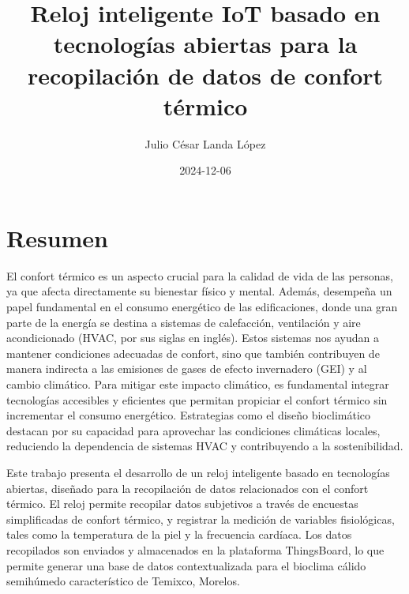 \documentclass[
  12pt,
  letterpaper,
  DIV=11,
  numbers=noendperiod]{scrreport}
\title{Reloj inteligente IoT basado en tecnologías abiertas para la
recopilación de datos de confort térmico}
\author{Julio César Landa López}
\date{2024-12-06}
\renewcommand*\contentsname{Tabla de contenidos}
\newcommand\contentsname{Tabla de contenidos}
\begin{document}
\maketitle
\ifdefined\Shaded\renewenvironment{Shaded}{\begin{tcolorbox}[boxrule=0pt, breakable, borderline west={3pt}{0pt}{shadecolor}, frame hidden, sharp corners, interior hidden, enhanced]}{\end{tcolorbox}}\fi

\renewcommand*\contentsname{Tabla de contenidos}
{
\hypersetup{linkcolor=}
\setcounter{tocdepth}{2}
\tableofcontents
}
\listoffigures
\listoftables
{}

\hypertarget{resumen}{%
\chapter*{Resumen}\label{resumen}}


El confort térmico es un aspecto crucial para la calidad de vida de las
personas, ya que afecta directamente su bienestar físico y mental.
Además, desempeña un papel fundamental en el consumo energético de las
edificaciones, donde una gran parte de la energía se destina a sistemas
de calefacción, ventilación y aire acondicionado (HVAC, por sus siglas
en inglés). Estos sistemas nos ayudan a mantener condiciones adecuadas
de confort, sino que también contribuyen de manera indirecta a las
emisiones de gases de efecto invernadero (GEI) y al cambio climático.
Para mitigar este impacto climático, es fundamental integrar tecnologías
accesibles y eficientes que permitan propiciar el confort térmico sin
incrementar el consumo energético. Estrategias como el diseño
bioclimático destacan por su capacidad para aprovechar las condiciones
climáticas locales, reduciendo la dependencia de sistemas HVAC y
contribuyendo a la sostenibilidad.

Este trabajo presenta el desarrollo de un reloj inteligente basado en
tecnologías abiertas, diseñado para la recopilación de datos
relacionados con el confort térmico. El reloj permite recopilar datos
subjetivos a través de encuestas simplificadas de confort térmico, y
registrar la medición de variables fisiológicas, tales como la
temperatura de la piel y la frecuencia cardíaca. Los datos recopilados
son enviados y almacenados en la plataforma ThingsBoard, lo que permite
generar una base de datos contextualizada para el bioclima cálido
semihúmedo característico de Temixco, Morelos.
\end{document}
